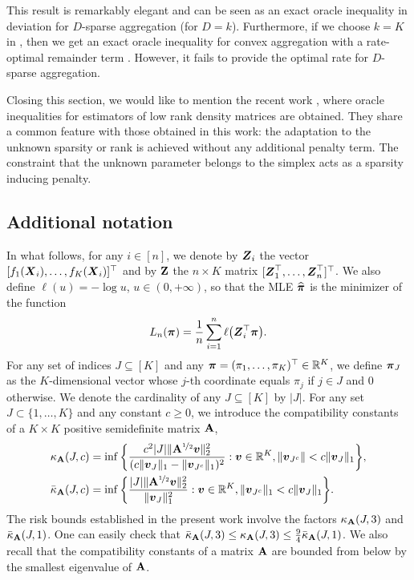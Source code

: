This result is remarkably elegant and can be seen as an exact oracle inequality in deviation for $D$-sparse aggregation (for $D=k$).
Furthermore, if we choose $k=K$ in , then we get an exact oracle inequality for convex aggregation with a
rate-optimal remainder term  \citep{Tsybakov03}. However, it fails to provide the optimal rate for $D$-sparse aggregation.

Closing this section, we would like to mention the recent work \citep{Xia16}, where oracle inequalities for estimators of low rank
density matrices are obtained. They share a common feature with those obtained in this work: the adaptation to the unknown sparsity
or rank is achieved without any additional penalty term. The constraint that the unknown parameter belongs to the simplex acts
as a sparsity inducing penalty.

\subsection{Additional notation}

In what follows, for any $i\in [n]$, we denote by $\boldsymbol Z_i$ the vector $[f_1(\boldsymbol X_i),\ldots,f_K(\boldsymbol X_i)]^\top$ and
by $\mathbf Z$ the $n\times K$ matrix  $[\boldsymbol Z^\top_1,\ldots,\boldsymbol Z^\top_n]^\top$. We also define $\ell(u) = -\log u$,
$u\in(0,+\infty)$,
so that the MLE $\widehat{\boldsymbol \pi}$ is the minimizer of the function
\begin{equation}
\label{Phi}
L_n(\boldsymbol \pi) = \frac1n\sum_{i=1}^n \ell\big(\boldsymbol Z_i^\top\boldsymbol \pi\big).
\end{equation}
For any set of indices $J\subseteq [K]$ and any $\boldsymbol \pi=(\pi_1,\dots,\pi_K)^{\top}\in{\mathbb R}^K$,
we define $\boldsymbol \pi_J$ as the $K$-dimensional vector whose $j$-th coordinate equals $\pi_j$ if $j\in J$ and $0$ otherwise.
We denote the cardinality of any $J\subseteq[K]$ by $\vert J\vert$. For any set $J\subset \{1, \dots, K\}$ and any
constant $c\geq 0$, we introduce the compatibility constants \citep{VandeGeerConditionLasso09}
of a $K\times K$ positive semidefinite matrix $\mathbf A$,
\begin{align}
\kappa_{\mathbf A}(J,c) &= \inf\bigg\{ \frac{c^2|J|\|\mathbf A^{\nicefrac12}\boldsymbol v \|_2^2}{(c\|\boldsymbol v_J\|_1-\|\boldsymbol v_{J^c}\|_1)^2} :
\boldsymbol v\in{\mathbb R}^K,\|\boldsymbol v_{J^c}\|< c\|\boldsymbol v_J\|_1\bigg\},\\
\bar\kappa_\mathbf A(J,c) &=\inf\bigg\{\frac{|J|\|\mathbf A^{\nicefrac12}\boldsymbol v\|_2^{2}}{\Vert \boldsymbol v_{J}\Vert^{2}_{1}}:
\boldsymbol v\in{\mathbb R}^{K},\Vert \boldsymbol v_{J^{c}}\Vert_{1}<c\Vert \boldsymbol v_{J}\Vert_{1}\bigg\}.
\end{align}
The risk bounds established in the present work involve the factors $\kappa_{\mathbf A}(J,3)$ and
$\bar\kappa_{\mathbf A}(J,1)$. One can easily check that $\bar\kappa_{\mathbf A}(J,3)\le \kappa_{\mathbf A}(J,3)
\le \frac94 \bar\kappa_{\mathbf A}(J,1)$. We also recall that the compatibility constants of a matrix
$\mathbf A$ are bounded  from below by the smallest eigenvalue of $\mathbf A$.

